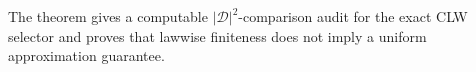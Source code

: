 The theorem gives a computable \(|\mathcal D|^2\)-comparison audit for the exact CLW selector and proves that lawwise finiteness does not imply a uniform approximation guarantee.